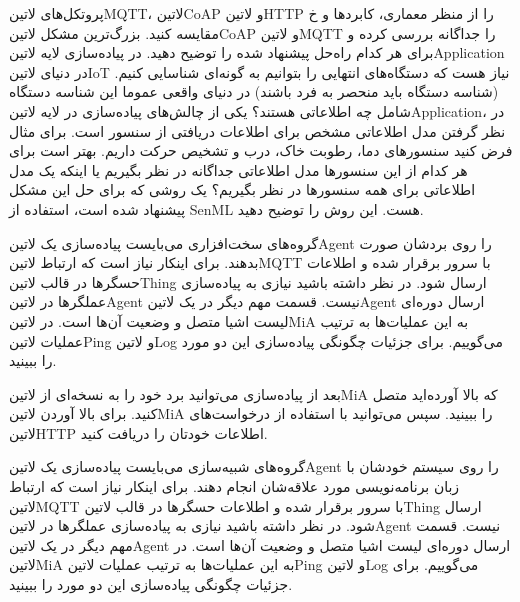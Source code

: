\documentclass[]{assignment}
\begin{document}

 پروتکل‌های ‌لاتین{MQTT}، ‌لاتین{CoAP} و ‌لاتین{HTTP} را از منظر معماری، کابردها و ‌خ مقایسه کنید.
 بزرگ‌ترین مشکل ‌لاتین{CoAP} و ‌لاتین{MQTT} را جداگانه بررسی کرده و برای هر کدام راه‌حل پیشنهاد شده را توضیح دهید.
 در پیاده‌سازی لایه ‌لاتین{Application} در دنیای ‌لاتین{IoT} نیاز هست که دستگاه‌های انتهایی را بتوانیم به گونه‌ای شناسایی کنیم. (شناسه دستگاه‌ باید منحصر به فرد باشند) در دنیای واقعی عموما این شناسه دستگاه‌ شامل چه اطلاعاتی هستند؟
 یکی از چالش‌های پیاده‌سازی در لایه ‌لاتین{Application}، در نظر گرفتن مدل اطلاعاتی مشخص برای اطلاعات دریافتی از سنسور است.
برای مثال فرض کنید سنسور‌های دما، رطوبت خاک، درب و تشخیص حرکت داریم. بهتر است برای هر کدام از این سنسورها مدل اطلاعاتی جداگانه در نظر بگیریم یا اینکه یک مدل اطلاعاتی برای همه سنسور‌ها در نظر بگیریم؟
یک روشی که برای حل این مشکل پیشنهاد شده است، استفاده از SenML هست. این روش را توضیح دهید.



گروه‌های سخت‌افزاری می‌بایست پیاده‌سازی یک ‌لاتین{Agent} را روی بردشان صورت بدهند.
برای اینکار نیاز است که ارتباط ‌لاتین{MQTT}
با سرور برقرار شده و اطلاعات حسگرها در قالب ‌لاتین{Thing} ارسال شود. در نظر داشته باشید نیازی به پیاده‌سازی عملگرها در ‌لاتین{Agent} نیست.
قسمت مهم دیگر در یک ‌لاتین{Agent} ارسال دوره‌ای لیست اشیا متصل و وضعیت آن‌ها است. در ‌لاتین{MiA} به این عملیات‌ها به ترتیب عملیات
‌لاتین{Ping} و ‌لاتین{Log} می‌گوییم. برای جزئیات چگونگی پیاده‌سازی این دو مورد  را ببینید.

بعد از پیاده‌سازی می‌توانید برد خود را به نسخه‌ای از ‌لاتین{MiA} که بالا آورده‌اید متصل کنید.
برای بالا آوردن ‌لاتین{MiA}  را ببینید.
سپس می‌توانید با استفاده از درخواست‌های ‌لاتین{HTTP} اطلاعات خودتان را دریافت کنید.

گروه‌های شبیه‌سازی می‌بایست پیاده‌سازی یک ‌لاتین{Agent} را روی سیستم خودشان با زبان برنامه‌نویسی مورد علاقه‌شان انجام دهند.
برای اینکار نیاز است که ارتباط ‌لاتین{MQTT}
با سرور برقرار شده و اطلاعات حسگرها در قالب ‌لاتین{Thing} ارسال شود. در نظر داشته باشید نیازی به پیاده‌سازی عملگرها در ‌لاتین{Agent} نیست.
قسمت مهم دیگر در یک ‌لاتین{Agent} ارسال دوره‌ای لیست اشیا متصل و وضعیت آن‌ها است. در ‌لاتین{MiA} به این عملیات‌ها به ترتیب عملیات
‌لاتین{Ping} و ‌لاتین{Log} می‌گوییم. برای جزئیات چگونگی پیاده‌سازی این دو مورد  را ببینید.
\end{document}
